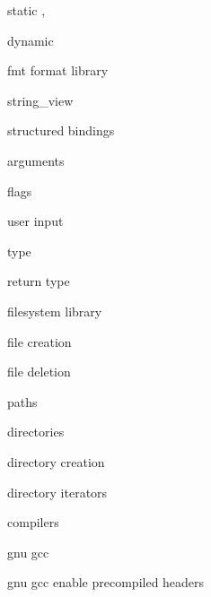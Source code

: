          static ,
        
         dynamic 
        
         fmt format library
          
         string_view
        
         structured bindings
        
         arguments 
        
         flags 
        
         user input 
        
         type 
        
         return type 
        
         filesystem library
         
         file creation 
        
         file deletion 
        
         paths 
        
         directories

         directory creation
        
         directory iterators 
        
         compilers 
        
         gnu gcc
        
         gnu gcc enable precompiled headers
        
